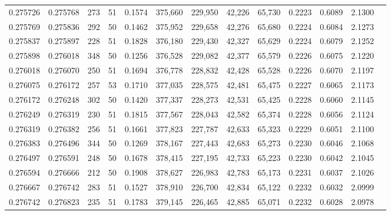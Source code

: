 \begin{tabular}{rrrrrrrrrrrrr}
0.275726 & 0.275768 &   273 &  51 &                                     0.1574 & 375,660 & 229,950 &  42,226 &  65,730 & 0.2223 & 0.6089 & 2.1300 \\
0.275769 & 0.275836 &   292 &  50 &                                     0.1462 & 375,952 & 229,658 &  42,276 &  65,680 & 0.2224 & 0.6084 & 2.1273 \\
0.275837 & 0.275897 &   228 &  51 &                                     0.1828 & 376,180 & 229,430 &  42,327 &  65,629 & 0.2224 & 0.6079 & 2.1252 \\
0.275898 & 0.276018 &   348 &  50 &                                     0.1256 & 376,528 & 229,082 &  42,377 &  65,579 & 0.2226 & 0.6075 & 2.1220 \\
0.276018 & 0.276070 &   250 &  51 &                                     0.1694 & 376,778 & 228,832 &  42,428 &  65,528 & 0.2226 & 0.6070 & 2.1197 \\
0.276075 & 0.276172 &   257 &  53 &                                     0.1710 & 377,035 & 228,575 &  42,481 &  65,475 & 0.2227 & 0.6065 & 2.1173 \\
0.276172 & 0.276248 &   302 &  50 &                                     0.1420 & 377,337 & 228,273 &  42,531 &  65,425 & 0.2228 & 0.6060 & 2.1145 \\
0.276249 & 0.276319 &   230 &  51 &                                     0.1815 & 377,567 & 228,043 &  42,582 &  65,374 & 0.2228 & 0.6056 & 2.1124 \\
0.276319 & 0.276382 &   256 &  51 &                                     0.1661 & 377,823 & 227,787 &  42,633 &  65,323 & 0.2229 & 0.6051 & 2.1100 \\
0.276383 & 0.276496 &   344 &  50 &                                     0.1269 & 378,167 & 227,443 &  42,683 &  65,273 & 0.2230 & 0.6046 & 2.1068 \\
0.276497 & 0.276591 &   248 &  50 &                                     0.1678 & 378,415 & 227,195 &  42,733 &  65,223 & 0.2230 & 0.6042 & 2.1045 \\
0.276594 & 0.276666 &   212 &  50 &                                     0.1908 & 378,627 & 226,983 &  42,783 &  65,173 & 0.2231 & 0.6037 & 2.1026 \\
0.276667 & 0.276742 &   283 &  51 &                                     0.1527 & 378,910 & 226,700 &  42,834 &  65,122 & 0.2232 & 0.6032 & 2.0999 \\
0.276742 & 0.276823 &   235 &  51 &                                     0.1783 & 379,145 & 226,465 &  42,885 &  65,071 & 0.2232 & 0.6028 & 2.0978 \\

\end{tabular}
